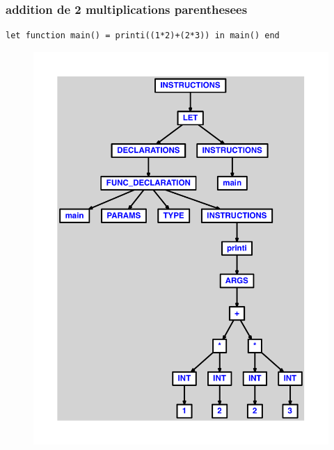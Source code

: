 \documentclass{article}
\begin{document}
\subsubsection{addition de 2 multiplications parenthesees}
\begin{lstlisting}
let function main() = printi((1*2)+(2*3)) in main() end
\end{lstlisting}
\newpage
\begin{figure}[H]
\centering
\includegraphics[max width=\textwidth]{ast/ast_107.pdf}
\end{figure}
\newpage
\end{document}
